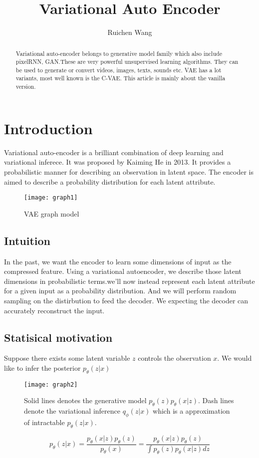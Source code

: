 \documentclass{article}
\author{Ruichen Wang}
\title{Variational Auto Encoder}
\begin{document}
\maketitle
\begin{abstract}
Variational auto-encoder \cite{DBLP:journals/corr/KingmaW13} belongs to generative model family which also include pixelRNN, GAN.These are very powerful unsupervised learning algorithms. They can be used to generate or convert videos, images, texts, sounds etc. VAE has a lot variants, most well known is the C-VAE. This article is mainly about the vanilla version.
\end{abstract}

\tableofcontents
\section{Introduction} 
Variational auto-encoder is a brilliant combination of deep learning and variational inferece. It was proposed by Kaiming He in 2013. It provides a probabilistic manner for describing an observation in latent space. The encoder is aimed to describe a probability distribution for each latent attribute.
\begin{figure}[h]
\centering
\texttt{[image: graph1]}
\caption{VAE graph model}
\end{figure}
\subsection{Intuition}
In the past, we want the encoder to learn some  dimensions of input as the compressed feature. Using a variational autoencoder, we describe those latent dimensions in probabilistic terms.we'll now instead represent each latent attribute for a given input as a probability distribution. And we will perform random sampling on the distirbution to feed the decoder. We expecting the decoder can accurately reconstruct the input.

\subsection{Statisical motivation}
Suppose there exists some latent variable $z$ controls the observation $x$. We would like to infer the posterior $p_{\theta}(z|x)$
\begin{figure}[h]
\centering
\texttt{[image: graph2]}
\caption{Solid lines denotes the generative model $p_{\theta}(z)p_{\theta}(x|z)$. Dash lines denote the variational inference $q_{\phi}(z|x)$ which is a approximation of intractable $p_{\theta}(z|x)$.}
\end{figure}
$$p_{\theta}(z|x)=\frac{p_{\theta}(x|z)p_{\theta}(z)}{p_{\theta}(x)}=\frac{p_{\theta}(x|z)p_{\theta}(z)}{\int p_{\theta}(z)p_{\theta}(x|z)dz}$$
\end{document}
